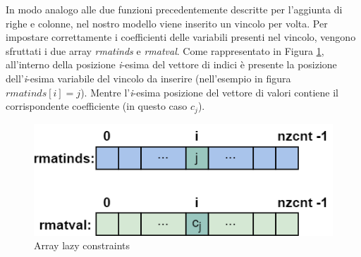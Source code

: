 In modo analogo alle due funzioni precedentemente descritte per l'aggiunta di righe e colonne, nel nostro modello viene inserito un vincolo per volta. Per impostare correttamente i coefficienti delle variabili presenti nel vincolo, vengono sfruttati i due array \textit{rmatinds} e \textit{rmatval}. Come rappresentato in Figura \ref{lazy_constraints}, all'interno della posizione \textit{i}-esima del vettore di indici è presente la posizione dell'\textit{i}-esima variabile del vincolo da inserire (nell'esempio in figura $rmatinds[i]=j$). Mentre l'\textit{i}-esima posizione del vettore di valori contiene il corrispondente  coefficiente (in questo caso $c_j$).
\begin{figure}[h] 
\begin{center} 
  \includegraphics[scale=0.5]{Images/lazy_constraints} 
  \caption{\footnotesize{Array lazy constraints}}
  \label{lazy_constraints} 
\end{center} 
\end{figure}
